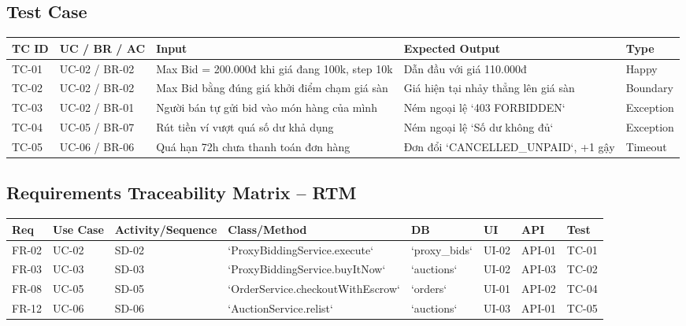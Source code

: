 \documentclass[11pt,a4paper]{article}
\begin{document}
\subsection{Test Case}
\begin{table}[H]
    \centering
    \small
    \begin{tabularx}{\textwidth}{|l|l|X|X|l|}
        \hline
        \textbf{TC ID} & \textbf{UC / BR / AC} & \textbf{Input} & \textbf{Expected Output} & \textbf{Type} \\ \hline
        TC-01 & UC-02 / BR-02 & Max Bid = 200.000đ khi giá đang 100k, step 10k & Dẫn đầu với giá 110.000đ & Happy \\ \hline
        TC-02 & UC-02 / BR-02 & Max Bid bằng đúng giá khởi điểm chạm giá sàn & Giá hiện tại nhảy thẳng lên giá sàn & Boundary \\ \hline
        TC-03 & UC-02 / BR-01 & Người bán tự gửi bid vào món hàng của mình & Ném ngoại lệ `403 FORBIDDEN` & Exception \\ \hline
        TC-04 & UC-05 / BR-07 & Rút tiền ví vượt quá số dư khả dụng & Ném ngoại lệ `Số dư không đủ` & Exception \\ \hline
        TC-05 & UC-06 / BR-06 & Quá hạn 72h chưa thanh toán đơn hàng & Đơn đổi `CANCELLED_UNPAID`, +1 gậy & Timeout \\ \hline
    \end{tabularx}
\end{table}

\subsection{Requirements Traceability Matrix -- RTM}
\begin{table}[H]
    \centering
    \scriptsize
    \begin{tabularx}{\textwidth}{|l|l|l|l|l|l|l|l|}
        \hline
        \textbf{Req} & \textbf{Use Case} & \textbf{Activity/Sequence} & \textbf{Class/Method} & \textbf{DB} & \textbf{UI} & \textbf{API} & \textbf{Test} \\ \hline
        FR-02 & UC-02 & SD-02 & `ProxyBiddingService.execute` & `proxy_bids` & UI-02 & API-01 & TC-01 \\ \hline
        FR-03 & UC-03 & SD-03 & `ProxyBiddingService.buyItNow` & `auctions` & UI-02 & API-03 & TC-02 \\ \hline
        FR-08 & UC-05 & SD-05 & `OrderService.checkoutWithEscrow` & `orders` & UI-01 & API-02 & TC-04 \\ \hline
        FR-12 & UC-06 & SD-06 & `AuctionService.relist` & `auctions` & UI-03 & API-01 & TC-05 \\ \hline
    \end{tabularx}
\end{table}
\end{document}
